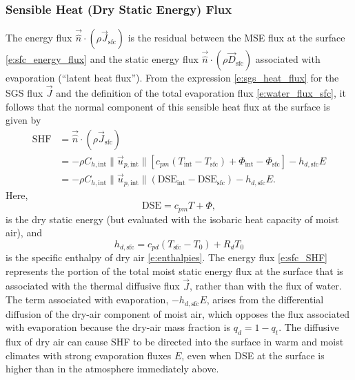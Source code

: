 \documentclass{report}
\begin{document}
\subsubsection{Sensible Heat (Dry Static Energy) Flux} 

The energy flux $\vec{\hat n} \cdot (\rho \vec{J}_{\mathrm{sfc}})$ is the residual between the MSE flux at the surface \eqref{e:sfc_energy_flux} and the static energy flux $\vec{\hat n} \cdot (\rho \vec{D}_\mathrm{sfc})$ associated with evaporation (``latent heat flux''). From the expression \eqref{e:sgs_heat_flux} for the SGS flux $\vec{J}$ and the definition of the total evaporation flux \eqref{e:water_flux_sfc}, it follows that the normal component of this sensible heat flux at the surface is given by 
\begin{equation}\label{e:sfc_SHF}
\begin{split}
    \mathrm{SHF} & = \vec{\hat n} \cdot (\rho \vec{J}_{\mathrm{sfc}}) \\ 
    & = -\rho C_{h, \mathrm{int}} \| \vec{u}_{p, \mathrm{int}} \|
    \left[ c_{pm} \left(T_\mathrm{int} - T_\mathrm{sfc} \right) + \Phi_\mathrm{int} - \Phi_\mathrm{sfc} \right] 
    - h_{d,\mathrm{sfc}}  E \\
    & = -\rho C_{h, \mathrm{int}} \| \vec{u}_{p, \mathrm{int}} \|
    \left(\mathrm{DSE_{int}} - \mathrm{DSE_{sfc}} \right)  
    - h_{d,\mathrm{sfc}}  E.
\end{split}
\end{equation}
Here,
\begin{equation}
    \mathrm{DSE} = c_{pm} T + \Phi,
\end{equation}
is the dry static energy (but evaluated with the isobaric heat capacity of moist air), and
\begin{equation}
h_{d, \mathrm{sfc}} = c_{pd} (T_\mathrm{sfc} - T_0) + R_d T_0
\end{equation}
is the specific enthalpy of dry air \eqref{e:enthalpies}. The energy flux \eqref{e:sfc_SHF} represents the portion of the total moist static energy flux at the surface that is associated with the thermal diffusive flux $\vec{J}$, rather than with the flux of water. The term associated with evaporation, $-h_{d,\mathrm{sfc}} E$, arises from the differential diffusion of the dry-air component of moist air, which opposes the flux associated with evaporation because the dry-air mass fraction is $q_d = 1-q_t$. The diffusive flux of dry air can cause SHF to be directed into the surface in warm and moist climates with strong evaporation fluxes $E$, even when DSE at the surface is higher than in the atmosphere immediately above.
\end{document}
